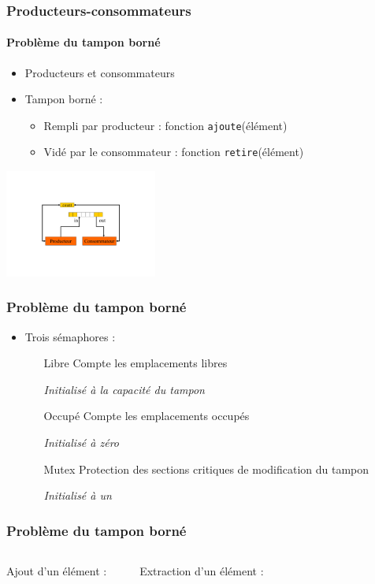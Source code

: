 \begin{frame}
\frametitle{Producteurs-consommateurs}
\framesubtitle{Problème du tampon borné}
\begin{itemize}
\item Producteurs et consommateurs
\item Tampon borné :
\begin{itemize}
\item Rempli par producteur : fonction \texttt{ajoute}(élément)
\item Vidé par le consommateur : fonction \texttt{retire}(élément)
\end{itemize}
\end{itemize}
\begin{center}
\includegraphics[width=5cm]{../illustration/prod_consom_tampon.pdf}
\end{center}
\end{frame}

\begin{frame}
\frametitle{Problème du tampon borné}
\begin{itemize}
\item Trois sémaphores :
\begin{itemize}
\item[Libre] Compte les emplacements libres
\begin{center}\textit{Initialisé à la capacité du tampon}\end{center}
\item[Occupé] Compte les emplacements occupés
\begin{center}\textit{Initialisé à zéro}\end{center}
\item[Mutex] Protection des sections critiques de modification du tampon
\begin{center}\textit{Initialisé à un}\end{center}
\end{itemize}
\end{itemize}
\end{frame}

\begin{frame}
\frametitle{Problème du tampon borné}
\begin{columns}
Ajout d’un élément :
\begin{scriptsize}\end{scriptsize}
Extraction d’un élément :
\begin{scriptsize}\end{scriptsize}
\end{columns}
\end{frame}

